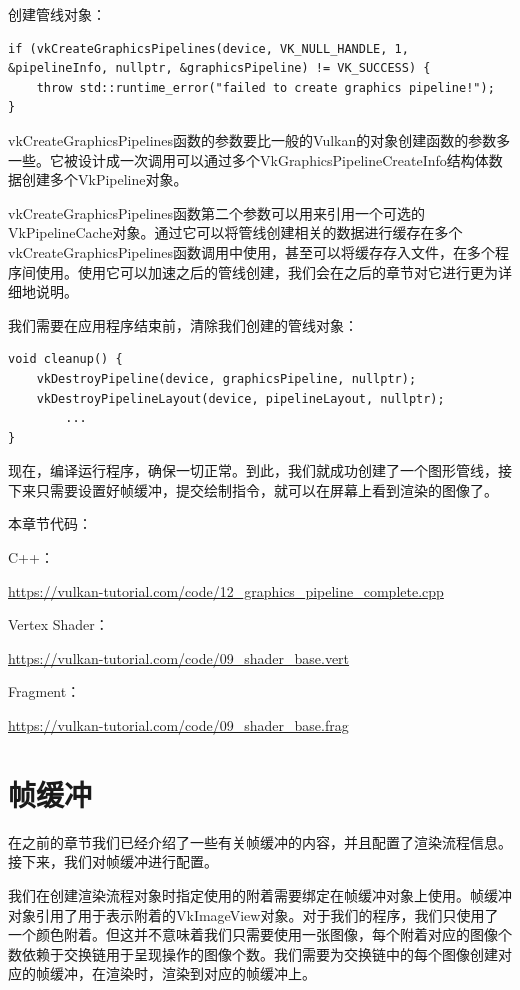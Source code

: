 \documentclass{ctexart}
\begin{document}
创建管线对象：

\begin{lstlisting}[language={[ANSI]C}]
if (vkCreateGraphicsPipelines(device, VK_NULL_HANDLE, 1, &pipelineInfo, nullptr, &graphicsPipeline) != VK_SUCCESS) {
	throw std::runtime_error("failed to create graphics pipeline!");
}
\end{lstlisting}

vkCreateGraphicsPipelines函数的参数要比一般的Vulkan的对象创建函数的参数多一些。它被设计成一次调用可以通过多个VkGraphicsPipelineCreateInfo结构体数据创建多个VkPipeline对象。

vkCreateGraphicsPipelines函数第二个参数可以用来引用一个可选的VkPipelineCache对象。通过它可以将管线创建相关的数据进行缓存在多个vkCreateGraphicsPipelines函数调用中使用，甚至可以将缓存存入文件，在多个程序间使用。使用它可以加速之后的管线创建，我们会在之后的章节对它进行更为详细地说明。

我们需要在应用程序结束前，清除我们创建的管线对象：

\begin{lstlisting}[language={[ANSI]C}]
void cleanup() {
	vkDestroyPipeline(device, graphicsPipeline, nullptr);
	vkDestroyPipelineLayout(device, pipelineLayout, nullptr);
		...
}
\end{lstlisting}

现在，编译运行程序，确保一切正常。到此，我们就成功创建了一个图形管线，接下来只需要设置好帧缓冲，提交绘制指令，就可以在屏幕上看到渲染的图像了。

本章节代码：

C++：

\url{https://vulkan-tutorial.com/code/12_graphics_pipeline_complete.cpp}

Vertex Shader：

\url{https://vulkan-tutorial.com/code/09_shader_base.vert}

Fragment：

\url{https://vulkan-tutorial.com/code/09_shader_base.frag}

\newpage
\section{帧缓冲}

在之前的章节我们已经介绍了一些有关帧缓冲的内容，并且配置了渲染流程信息。接下来，我们对帧缓冲进行配置。

我们在创建渲染流程对象时指定使用的附着需要绑定在帧缓冲对象上使用。帧缓冲对象引用了用于表示附着的VkImageView对象。对于我们的程序，我们只使用了一个颜色附着。但这并不意味着我们只需要使用一张图像，每个附着对应的图像个数依赖于交换链用于呈现操作的图像个数。我们需要为交换链中的每个图像创建对应的帧缓冲，在渲染时，渲染到对应的帧缓冲上。
\end{document}
